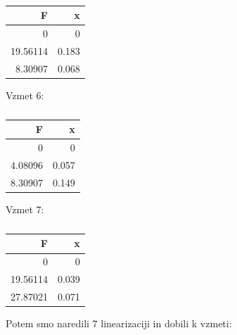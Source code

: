\documentclass[11pt]{article}
\begin{document}
    \begin{table}[H]
        \centering
        \begin{tabular}{|r|r|}
            \hline
            \textbf{F} & \textbf{x} \\
            \hline
            0 & 0 \\
            19.56114 & 0.183 \\
            8.30907 & 0.068 \\
            \hline
        \end{tabular}
        \caption{}
        \label{tab:5}
    \end{table}
    Vzmet 6:

    \begin{table}[H]
        \centering
        \begin{tabular}{|r|r|}
            \hline
            \textbf{F} & \textbf{x} \\
            \hline
            0 & 0 \\
            4.08096 & 0.057 \\
            8.30907 & 0.149 \\
            \hline
        \end{tabular}
        \caption{}
        \label{tab:6}
    \end{table}
    Vzmet 7:
    \begin{table}[H]
        \centering
        \begin{tabular}{|r|r|}
            \hline
            \textbf{F} & \textbf{x} \\
            \hline
            0 & 0 \\
            19.56114 & 0.039 \\
            27.87021 & 0.071 \\
            \hline
        \end{tabular}
        \caption{}
        \label{tab:7}
    \end{table}

    Potem smo naredili 7 linearizaciji in dobili k vzmeti:
\end{document}
